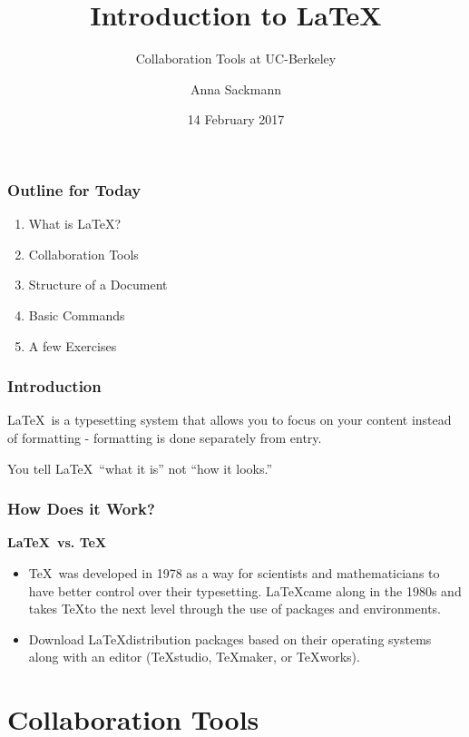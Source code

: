 \documentclass[12pt, compress]{beamer}
\title{Introduction to \LaTeX}
\subtitle{Collaboration Tools at UC-Berkeley}
\date{14 February 2017}
\author{Anna Sackmann}
\institute{University of California, Berkeley}
\begin{document}
\maketitle

\begin{frame}[fragile]
  \frametitle{Outline for Today}
    \begin{enumerate}
        \item What is \LaTeX?
        \item Collaboration Tools
        \item Structure of a Document
        \item Basic Commands
        \item A few Exercises
    \end{enumerate}
\end{frame}

\begin{frame}[fragile]
  \frametitle{Introduction}

\LaTeX\ is a typesetting system that allows you to focus on your content instead of formatting - formatting is done separately from entry.
 
 You tell \LaTeX\ ``what it is'' not ``how it looks.''
\end{frame}

\begin{frame}[fragile]
  \frametitle{How Does it Work?}
 {\bf \LaTeX\ vs. \TeX}
  \begin{itemize}
      \item \TeX\ was developed in 1978 as a way for scientists and mathematicians to have better control over their typesetting. \LaTeX came along in the 1980s and takes \TeX to the next level through the use of packages and environments.
      \item Download \LaTeX distribution packages based on their operating systems along with an editor (TeXstudio, TeXmaker, or TeXworks). 
  \end{itemize}
\end{frame}

\section{Collaboration Tools}
\end{document}
